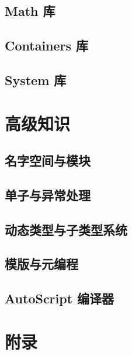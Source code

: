 \documentclass[lang=cn, scheme=chinese, 10pt]{elegantbook}
\begin{document}
\chapter{Math 库}

\chapter{Containers 库}


\chapter{System 库}


\part{高级知识}

\chapter{名字空间与模块}


\chapter{单子与异常处理}


\chapter{动态类型与子类型系统}


\chapter{模版与元编程}


\chapter{AutoScript 编译器}


\appendix
\part{附录}

\end{document}
